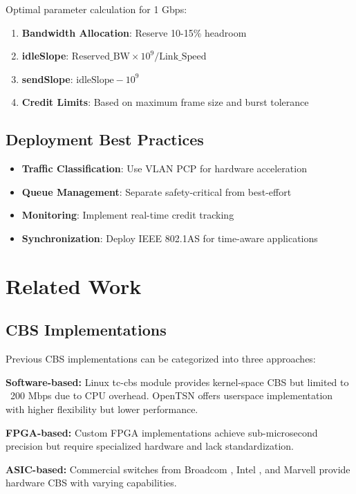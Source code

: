 \documentclass[10pt, journal, compsoc]{IEEEtran}
\begin{document}
Optimal parameter calculation for 1 Gbps:

\begin{enumerate}
    \item \textbf{Bandwidth Allocation}: Reserve 10-15\% headroom
    \item \textbf{idleSlope}: $\text{Reserved\_BW} \times 10^9 / \text{Link\_Speed}$
    \item \textbf{sendSlope}: $\text{idleSlope} - 10^9$
    \item \textbf{Credit Limits}: Based on maximum frame size and burst tolerance
\end{enumerate}

\subsection{Deployment Best Practices}

\begin{itemize}
    \item \textbf{Traffic Classification}: Use VLAN PCP for hardware acceleration
    \item \textbf{Queue Management}: Separate safety-critical from best-effort
    \item \textbf{Monitoring}: Implement real-time credit tracking
    \item \textbf{Synchronization}: Deploy IEEE 802.1AS for time-aware applications
\end{itemize}

\section{Related Work}

\subsection{CBS Implementations}

Previous CBS implementations can be categorized into three approaches:

\textbf{Software-based:} Linux tc-cbs module \cite{linux_cbs} provides kernel-space CBS but limited to ~200 Mbps due to CPU overhead. OpenTSN \cite{opentsn} offers userspace implementation with higher flexibility but lower performance.

\textbf{FPGA-based:} Custom FPGA implementations \cite{fpga_cbs} achieve sub-microsecond precision but require specialized hardware and lack standardization.

\textbf{ASIC-based:} Commercial switches from Broadcom \cite{broadcom_tsn}, Intel \cite{intel_tsn}, and Marvell \cite{marvell_tsn} provide hardware CBS with varying capabilities.
\end{document}
